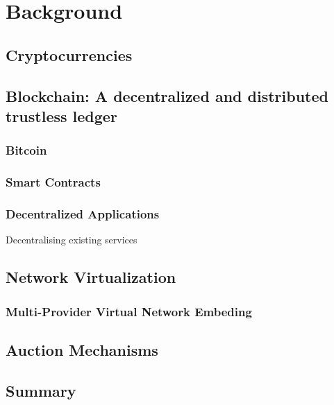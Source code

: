 \chapter{Background}
\label{ch:background}

\section{Cryptocurrencies}

\section{Blockchain: A decentralized and distributed trustless ledger}

\subsection{Bitcoin}

\subsection{Smart Contracts}

\subsection{Decentralized Applications}

Decentralising existing services

\section{Network Virtualization}

\subsection{Multi-Provider Virtual Network Embeding}

\section{Auction Mechanisms}

\section{Summary}


